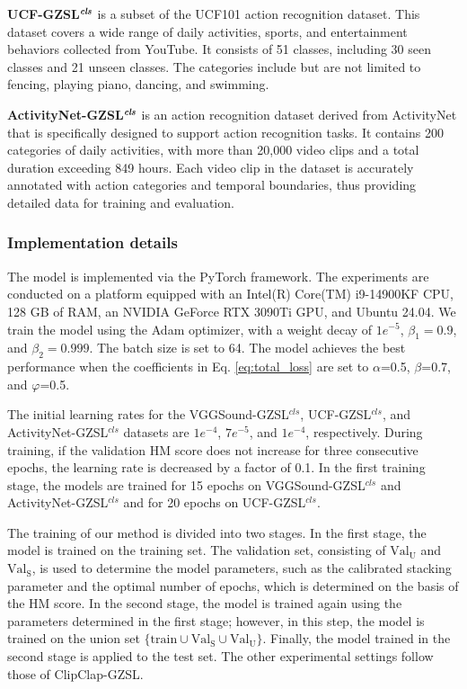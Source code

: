 \documentclass[lettersize,journal]{IEEEtran}
\begin{document}
\textbf{UCF-GZSL}$^{\textbf{\textit{cls}}}$ is a subset of the UCF101 action recognition dataset\cite{35}. This dataset covers a wide range of daily activities, sports, and entertainment behaviors collected from YouTube. It consists of 51 classes, including 30 seen classes and 21 unseen classes. The categories include but are not limited to fencing, playing piano, dancing, and swimming.


\textbf{ActivityNet-GZSL}$^{\textbf{\textit{cls}}}$ is an action recognition dataset derived from ActivityNet\cite{36} that is specifically designed to support action recognition tasks. It contains 200 categories of daily activities, with more than 20,000 video clips and a total duration exceeding 849 hours. Each video clip in the dataset is accurately annotated with action categories and temporal boundaries, thus providing detailed data for training and evaluation.


\subsubsection{Implementation details}
The model is implemented via the PyTorch framework. The experiments are conducted on a platform equipped with an Intel(R) Core(TM) i9-14900KF CPU, 128 GB of RAM, an NVIDIA GeForce RTX 3090Ti GPU, and Ubuntu 24.04. We train the model using the Adam optimizer\cite{37}, with a weight decay of $1e^{-5}$, $\beta_1 = 0.9$, and $\beta_2 = 0.999$. The batch size is set to 64. The model achieves the best performance when the coefficients in Eq. \eqref{eq:total_loss} are set to $\alpha$=0.5, $\beta$=0.7, and $\varphi$=0.5.


The initial learning rates for the VGGSound-GZSL$^{\textit{cls}}$, UCF-GZSL$^{\textit{cls}}$, and ActivityNet-GZSL$^{\textit{cls}}$ datasets are $1e^{-4}$, $7e^{-5}$, and $1e^{-4}$, respectively. During training, if the validation HM score does not increase for three consecutive epochs, the learning rate is decreased by a factor of 0.1. In the first training stage, the models are trained for 15 epochs on VGGSound-GZSL$^{\textit{cls}}$ and ActivityNet-GZSL$^{\textit{cls}}$ and for 20 epochs on UCF-GZSL$^{\textit{cls}}$.


The training of our method is divided into two stages\cite{1,5,7}. In the first stage, the model is trained on the training set. The validation set, consisting of $\text{Val}_\text{U}$ and $\text{Val}_\text{S}$, is used to determine the model parameters, such as the calibrated stacking parameter and the optimal number of epochs, which is determined on the basis of the HM score. In the second stage, the model is trained again using the parameters determined in the first stage; however, in this step, the model is trained on the union set $\{\text{train} \cup \text{Val}_\text{S} \cup \text{Val}_\text{U}\}$. Finally, the model trained in the second stage is applied to the test set. The other experimental settings follow those of ClipClap-GZSL\cite{2}.
\end{document}
